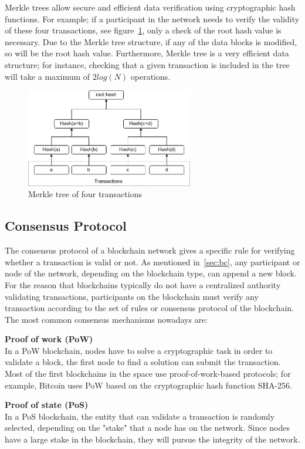 \documentclass[11pt,a4paper]{report}
\begin{document}
Merkle trees allow secure and efficient data verification using cryptographic hash functions. For example; if a participant in the network needs to verify the validity of these four transactions, see figure~\ref{fig:merkle}, only a check of the root hash value is necessary. Due to the Merkle tree structure, if any of the data blocks is modified, so will be the root hash value. Furthermore, Merkle tree is a very efficient data structure; for instance, checking that a given transaction is included in the tree will take a maximum of $2log (N)$ operations.
\begin{figure}[htp]
	\centering
	\includegraphics[width=0.65\textwidth]{./images/merkle}
	\caption{Merkle tree of four transactions}
	\label{fig:merkle}
\end{figure}
\subsection{Consensus Protocol}\label{sec:cp}
The consensus protocol\cite{article:bc} of a blockchain network gives a specific rule for verifying whether a transaction is valid or not. As mentioned in~\ref{sec:bc}, any participant or node of the network, depending on the blockchain type, can append a new block. For the reason that blockchains typically do not have a centralized authority validating transactions, participants on the blockchain must verify any transaction according to the set of rules or consensus protocol of the blockchain. The most common consensus mechanisms nowadays are:
\begin{description}		
	\item \textbf{Proof of work (PoW)}\\	In a PoW blockchain, nodes have to solve a cryptographic task in order to validate a block, the first node to find a solution can submit the transaction. Most of the first blockchains in the space use proof-of-work-based protocols; for example, Bitcoin uses PoW based on the cryptographic hash function SHA-256.
	\item \textbf{Proof of state (PoS)}\\	In a PoS blockchain, the entity that can validate a transaction is randomly selected, depending on the "stake" that a node has on the network. Since nodes have a large stake in the blockchain, they will pursue the integrity of the network. 	
\end{description}
\end{document}

